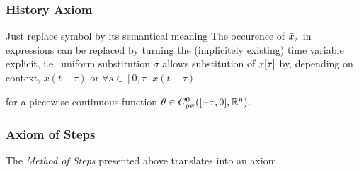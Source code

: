 \documentclass[10pt]{report}
\begin{document}


        \subsubsection{History Axiom}
            \label{history-axiom}
            Just replace symbol by its semantical meaning
            The occurence of $\bar{x}_{\tau}$ in expressions can be replaced by turning the (implicitely existing) time variable explicit, i.e.\
            uniform substitution $\sigma$
            allows substitution of $\xtau$ by, depending on context, $x(t-\tau)$ or $\forall{s\in[0,\tau]}{x(t-\tau)}$

            \begin{calculus}
            \end{calculus}
            for a piecewise continuous function $\theta\in C^0_\text{pw}([-\tau,0],\mathbb{R}^n)$.

        \subsubsection{Axiom of Steps}
            \label{sec:axiom-of-steps}
            The \emph{Method of Steps} presented above translates into an axiom.

            \begin{calculus}

            \end{calculus}
\end{document}

